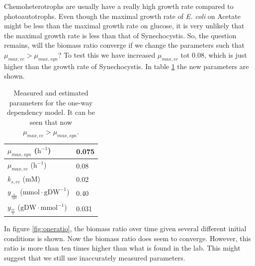 \documentclass[10pt]{report}
\begin{document}
Chemoheterotrophs are usually have a really high growth rate compared to photoautotrophs. Even though the maximal growth rate of \textit{E. coli} on Acetate might be less than the maximal growth rate on glucose, it is very unlikely that the maximal growth rate is less than that of Synechocystis. So, the question remains, will the biomass ratio converge if we change the parameters such that $\mu_{max,ec} > \mu_{max,syn}$?
To test this we have increased $\mu_{max,ec}$ tot 0.08, which is just higher than the growth rate of Synechocystis. In table \ref{tab:oh} the new parameters are shown.

\begin{table}[!ht]
 \begin{center}  
  \begin{tabular}{|l|l|}
   \hline
   $\mu_{max,syn}$ ($\text{h}^{-1}$) & 0.075 \\ \hline
   $\mu_{max,ec}$ ($\text{h}^{-1}$) & 0.08 \\ \hline
   $k_{s,ec}$ ($\text{mM}$) & 0.02 \\ \hline
   $y_{\frac{s}{syn}}$ ($\text{mmol}\cdot\text{gDW}^{-1}$) & 0.40 \\ \hline
   $y_{\frac{ec}{s}}$ ($\text{gDW}\cdot\text{mmol}^{-1}$) & 0.031 \\
   \hline   
  \end{tabular}
  \caption{Measured and estimated parameters for the one-way dependency model. It can be seen that now $\mu_{max,ec} > \mu_{max,syn}$.}
  \label{tab:oh}
 \end{center}
\end{table}

In figure \ref{fig:oneratio}, the biomass ratio over time given several different initial conditions is shown. Now the biomass ratio does seem to converge. However, this ratio is more than ten times higher than what is found in the lab. This might suggest that we still use inaccurately measured parameters. 
\end{document}
